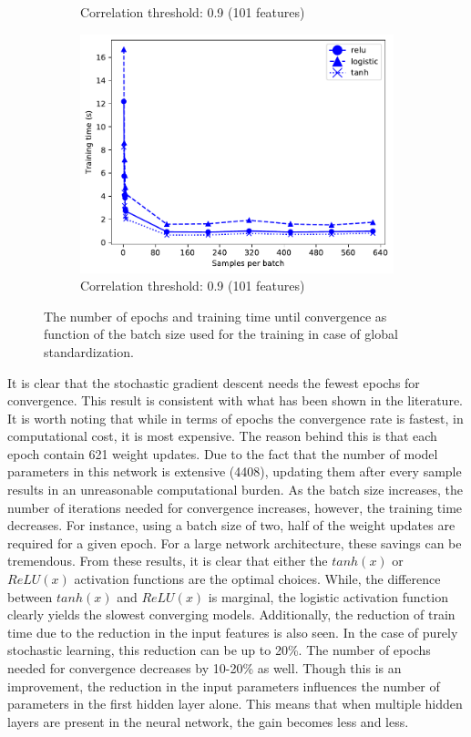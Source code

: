 \documentclass[paper=a4, fontsize=11pt]{scrartcl} %
\begin{document}
\begin{figure}[H]
\begin{subfigure}{0.5\linewidth}
		\caption{Correlation threshold: 0.9 (101 features)}
	\end{subfigure}
	\begin{subfigure}{0.5\linewidth}
		\centering
		\includegraphics[width=0.8\linewidth]{../output/neural_network/figures/nn_convergence_global_standard_941_486_feature_pearson_90_time}
		\caption{Correlation threshold: 0.9 (101 features)}
	\end{subfigure}
	\caption{The number of epochs and training time until convergence as function of the batch size used for the training in case of global standardization.}
	\label{fig:nn_convergence_global_gauss}
\end{figure}  

It is clear that the stochastic gradient descent needs the fewest epochs for convergence. 
This result is consistent with what has been shown in the literature.
It is worth noting that while in terms of epochs the convergence rate is fastest, in computational cost, it is most expensive.
The reason behind this is that each epoch contain 621 weight updates. 
Due to the fact that the number of model parameters in this network is extensive (4408), updating them after every sample results in an unreasonable computational burden.
As the batch size increases, the number of iterations needed for convergence increases, however, the training time decreases.
For instance, using a batch size of two, half of the weight updates are required for a given epoch.
For a large network architecture, these savings can be tremendous.
From these results, it is clear that either the $tanh(x)$ or $ReLU(x)$ activation functions are the optimal choices.
While, the difference between $tanh(x)$ and $ReLU(x)$ is marginal, the logistic activation function clearly yields the slowest converging models.
Additionally, the reduction of train time due to the reduction in the input features is also seen.
In the case of purely stochastic learning, this reduction can be up to 20\%. 
The number of epochs needed for convergence decreases by 10-20\% as well.
Though this is an improvement, the reduction in the input parameters influences the number of parameters in the first hidden layer alone.
This means that when multiple hidden layers are present in the neural network, the gain becomes less and less.
\end{document}
